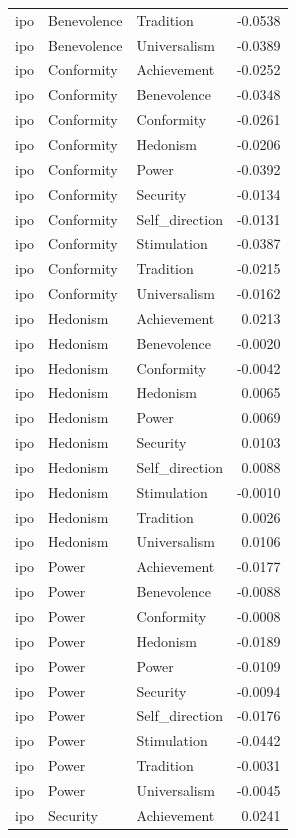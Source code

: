 \begin{tabular}{lllr}
ipo & Benevolence & Tradition & -0.0538 \\
ipo & Benevolence & Universalism & -0.0389 \\
ipo & Conformity & Achievement & -0.0252 \\
ipo & Conformity & Benevolence & -0.0348 \\
ipo & Conformity & Conformity & -0.0261 \\
ipo & Conformity & Hedonism & -0.0206 \\
ipo & Conformity & Power & -0.0392 \\
ipo & Conformity & Security & -0.0134 \\
ipo & Conformity & Self\_direction & -0.0131 \\
ipo & Conformity & Stimulation & -0.0387 \\
ipo & Conformity & Tradition & -0.0215 \\
ipo & Conformity & Universalism & -0.0162 \\
ipo & Hedonism & Achievement & 0.0213 \\
ipo & Hedonism & Benevolence & -0.0020 \\
ipo & Hedonism & Conformity & -0.0042 \\
ipo & Hedonism & Hedonism & 0.0065 \\
ipo & Hedonism & Power & 0.0069 \\
ipo & Hedonism & Security & 0.0103 \\
ipo & Hedonism & Self\_direction & 0.0088 \\
ipo & Hedonism & Stimulation & -0.0010 \\
ipo & Hedonism & Tradition & 0.0026 \\
ipo & Hedonism & Universalism & 0.0106 \\
ipo & Power & Achievement & -0.0177 \\
ipo & Power & Benevolence & -0.0088 \\
ipo & Power & Conformity & -0.0008 \\
ipo & Power & Hedonism & -0.0189 \\
ipo & Power & Power & -0.0109 \\
ipo & Power & Security & -0.0094 \\
ipo & Power & Self\_direction & -0.0176 \\
ipo & Power & Stimulation & -0.0442 \\
ipo & Power & Tradition & -0.0031 \\
ipo & Power & Universalism & -0.0045 \\
ipo & Security & Achievement & 0.0241 \\

\end{tabular}

